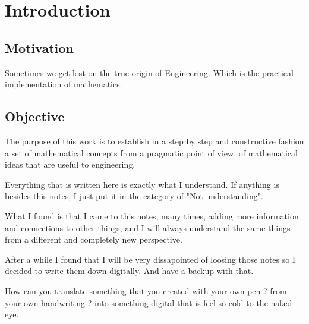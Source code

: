 \documentclass[11pt,fleqn]{book} %
\begin{document}
\tableofcontents %


\pagestyle{fancy} %



\chapter{Introduction}

\section{Motivation}


Sometimes we get lost on the true origin of Engineering.
Which is the practical implementation of mathematics.



\section{Objective}

The purpose of this work is to establish in a step by step and constructive fashion a set of mathematical concepts from a pragmatic point of view, of mathematical ideas that are useful to engineering.

Everything that is written here is exactly what I understand. If anything is besides this notes, I just put it in the category of "Not-understanding".  

What I found is that I came to this notes, many times, adding more information and connections to other things, and I will always understand the same things from a different and completely new perspective.

After a while I found that I will be very dissapointed of loosing those notes so I decided to write them down digitally. And have a backup with that.

How can you translate something that you created with your own pen ?  from your own handwriting ?  into something digital that is feel so cold to the naked eye.
\end{document}
